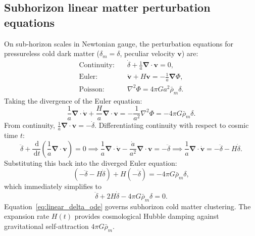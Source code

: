\documentclass[11pt]{article}
\newcommand{\dd}{\,\mathrm d}
\begin{document}
\subsection{Subhorizon linear matter perturbation equations}
On sub-horizon scales in Newtonian gauge, the perturbation equations for pressureless cold dark matter ($\delta_m = \delta$, peculiar velocity $\bm v$) are:
\begin{align}
\text{Continuity:} \quad & \dot\delta + \frac{1}{a}\bm\nabla \cdot \bm v = 0,\\
\text{Euler:} \quad & \dot{\bm v} + H\bm v = -\frac{1}{a}\bm\nabla\Phi,\\
\text{Poisson:} \quad & \nabla^2\Phi = 4\pi G a^2 \bar\rho_m \delta.
\end{align}
Taking the divergence of the Euler equation:
\begin{equation}
\frac{1}{a}\bm\nabla \cdot \dot{\bm v} + \frac{H}{a}\bm\nabla \cdot \bm v = -\frac{1}{a^2}\nabla^2\Phi = -4\pi G \bar\rho_m \delta.
\end{equation}
From continuity, $\frac{1}{a}\bm\nabla \cdot \bm v = -\dot\delta$. Differentiating continuity with respect to cosmic time $t$:
\begin{equation}
\ddot\delta + \frac{\dd}{\dd t}\left(\frac{1}{a}\bm\nabla \cdot \bm v\right) = 0 \implies \frac{1}{a}\bm\nabla \cdot \dot{\bm v} - \frac{\dot a}{a^2}\bm\nabla \cdot \bm v = -\ddot\delta \implies \frac{1}{a}\bm\nabla \cdot \dot{\bm v} = -\ddot\delta - H\dot\delta.
\end{equation}
Substituting this back into the diverged Euler equation:
\begin{equation}
(-\ddot\delta - H\dot\delta) + H(-\dot\delta) = -4\pi G \bar\rho_m \delta,
\end{equation}
which immediately simplifies to
\begin{equation}
\boxed{\ddot\delta + 2H\dot\delta - 4\pi G \bar\rho_m \delta = 0}.
\label{eq:linear_delta_ode}
\end{equation}
Equation~\eqref{eq:linear_delta_ode} governs subhorizon cold matter clustering. The expansion rate $H(t)$ provides cosmological Hubble damping against gravitational self-attraction $4\pi G\bar\rho_m$.
\end{document}
